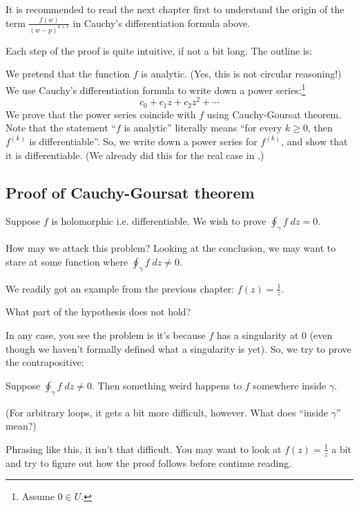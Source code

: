 It is recommended to read the next chapter first to understand the origin of the term
$\frac{f(w)}{(w-p)^{k+1}}$ in Cauchy's differentiation formula above.

Each step of the proof is quite intuitive, if not a bit long.
The outline is:
\begin{itemize}
	\ii We pretend that the function $f$ is analytic. (Yes, this is not circular reasoning!)
	\ii We use Cauchy's differentiation formula to write down a power series:\footnote{Assume $0 \in
	U$.}
	\[ c_0 + c_1 z + c_2 z^2 + \cdots \]
	\ii We prove that the power series coincide with $f$ using Cauchy-Goursat theorem.
	\ii Note that the statement ``$f$ is analytic'' literally means ``for every $k \geq 0$, then
	$f^{(k)}$ is differentiable''. So, we write down a power series for $f^{(k)}$, and show that it
	is differentiable.
	(We already did this for the real case in .)
\end{itemize}

\subsection{Proof of Cauchy-Goursat theorem}

Suppose $f$ is holomorphic i.e. differentiable. We wish to prove $\oint_\gamma f \; dz = 0$.

How may we attack this problem? Looking at the conclusion, we may want to stare at some function
where $\oint_\gamma f \; dz \neq 0$.

We readily got an example from the previous chapter: $f(z) = \frac{1}{z}$.
\begin{ques}
	What part of the hypothesis does not hold?
\end{ques}

In any case, you see the problem is it's because $f$ has a singularity at $0$ (even though we
haven't formally defined what a singularity is yet). So, we try to prove the contrapositive:
\begin{theorem}
	Suppose $\oint_\gamma f \; dz \neq 0$.
	Then something weird happens to $f$ somewhere inside $\gamma$.
\end{theorem}
(For arbitrary loops, it gets a bit more difficult, however. What does ``inside $\gamma$'' mean?)

Phrasing like this, it isn't that difficult. You may want to look at $f(z) = \frac{1}{z}$ a bit and
try to figure out how the proof follows before continue reading.

